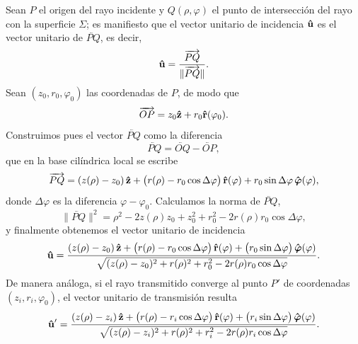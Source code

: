 Sean $P$ el origen del rayo incidente y $Q(\rho, \varphi)$ el punto de intersección del rayo con la superficie $\Sigma$; es manifiesto que el vector unitario de incidencia $\bm{\hat{\mathbf{u}}}$ es el vector unitario de $\lvec{PQ}$, es decir,
\begin{equation}
  \bm{\hat{\mathbf{u}}} = \frac{\overrightarrow{PQ}}{\lVert \overrightarrow{PQ} \rVert}.
  \label{eq:def_of_u}
\end{equation}
Sean $(z_0, r_0, \varphi_0)$ las coordenadas de $P$, de modo que
\begin{equation}
  \overrightarrow{OP} = z_0\bm{\hat{\mathbf{z}}} + r_0 \bm{\hat{\mathbf{r}}}(\varphi_0).
  \label{eq:def_OP_where_P_is_any_point_of_space}
\end{equation}
Construimos pues el vector $\lvec{PQ}$ como la diferencia
\begin{equation}
  \lvec{PQ} = \lvec{OQ} - \lvec{OP},
\end{equation}
que en la base cilíndrica local se escribe
\begin{equation}
 \overrightarrow{PQ} = (z(\rho) - z_0)\,\bm{\hat{\mathbf{z}}}
+ \bigl(r(\rho) - r_0 \cos\Delta\varphi\bigr)\,\bm{\hat{\mathbf{r}}}(\varphi)
+ r_0 \sin\Delta\varphi\,\bm{\hat{\mathbf{\varphi}}}(\varphi),
  \label{eq:explicit_PQ}
\end{equation}
donde $\Delta \varphi$ es la diferencia $\varphi - \varphi_0$.
Calculamos la norma de $\lvec{PQ}$,
\begin{equation}
  \lVert \lvec{PQ} \rVert^2
= \rho^2 - 2 z(\rho) z_0 + z_0^2
+ r_0^2 - 2 r(\rho) r_0 \cos\Delta\varphi,
\end{equation}
y finalmente obtenemos el vector unitario de incidencia
\begin{equation}
   \bm{\hat{\mathbf{u}}}
  =
  \frac{
  (z(\rho) - z_0)\,\bm{\hat{\mathbf{z}}}
  + \bigl(r(\rho) - r_0 \cos\Delta\varphi\bigr)\,\bm{\hat{\mathbf{r}}}(\varphi)
  + \bigl(r_0 \sin\Delta\varphi\bigr)\,\bm{\hat{\mathbf{\varphi}}}(\varphi)
  }{
  \sqrt{(z(\rho) - z_0)^2 + r(\rho)^2 + r_0^2 - 2 r(\rho) r_0 \cos\Delta\varphi}
  }.
  \label{eq:u_for_any_P}
\end{equation}
De manera análoga, si el rayo transmitido converge al punto $P'$ de coordenadas $(z_i, r_i, \varphi_0)$, el vector unitario de transmisión resulta
\begin{equation}
   \bm{\hat{\mathbf{u}}}'
  =
  \frac{
  (z(\rho) - z_i)\,\bm{\hat{\mathbf{z}}}
  + \bigl(r(\rho) - r_i \cos\Delta\varphi\bigr)\,\bm{\hat{\mathbf{r}}}(\varphi)
  + \bigl(r_i \sin\Delta\varphi\bigr)\,\bm{\hat{\mathbf{\varphi}}}(\varphi)
  }{
  \sqrt{(z(\rho) - z_i)^2 + r(\rho)^2 + r_i^2 - 2 r(\rho) r_i \cos\Delta\varphi}
  }.
  \label{eq:u_prime_for_any_P}
\end{equation}

